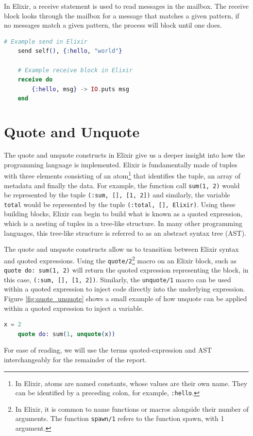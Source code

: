 \par
In Elixir, a receive statement is used to read messages in the mailbox. The receive block looks through the mailbox for a message that matches a given pattern, if no messages match a given pattern, the process will block until one does.
\begin{lstlisting}[language=Elixir, xleftmargin=.4\linewidth, caption={An example of spawn/1 and spawn/4 in Elixir for spawning a new lightweight process and a new Elixir node}]
    # Example send in Elixir
    send self(), {:hello, "world"}

    # Example receive block in Elixir
    receive do
        {:hello, msg} -> IO.puts msg
    end
\end{lstlisting}
\section{Quote and Unquote}
The quote and unquote constructs in Elixir give us a deeper insight into how the programming language is implemented. Elixir is fundamentally made of tuples with three elements consisting of an atom\footnote{In Elixir, atoms are named constants, whose values are their own name. They can be identified by a preceding colon, for example, \texttt{:hello}.} that identifies the tuple, an array of metadata and finally the data. For example, the function call \texttt{sum(1, 2)} would be represented by the tuple \texttt{(:sum, [], [1, 2])} and similarly, the variable \texttt{total} would be represented by the tuple \texttt{(:total, [], Elixir)}. Using these building blocks, Elixir can begin to build what is known as a quoted expression, which is a nesting of tuples in a tree-like structure. In many other programming languages, this tree-like structure is referred to as an abstract syntax tree (AST).
\par
The quote and unquote constructs allow us to transition between Elixir syntax and quoted expressions. Using the \texttt{quote/2}\footnote{In Elixir, it is common to name functions or macros alongside their number of arguments. The function \texttt{spawn/1} refers to the function spawn, with 1 argument.} macro on an Elixir block, such as \texttt{quote do: sum(1, 2)} will return the quoted expression representing the block, in this case, \texttt{(:sum, [], [1, 2])}. Similarly, the \texttt{unquote/1} macro can be used within a quoted expression to inject code directly into the underlying expression. Figure \ref{fig:quote_unquote} shows a small example of how unquote can be applied within a quoted expression to inject a variable.
\begin{lstlisting}[language=Elixir, xleftmargin=.4\linewidth, caption={Elixir example of \texttt{quote/2} and \texttt{unquote/1}.}, label={fig:quote_unquote}]
    x = 2
    quote do: sum(1, unquote(x))
\end{lstlisting}
For ease of reading, we will use the terms quoted-expression and AST interchangeably for the remainder of the report.
\par

